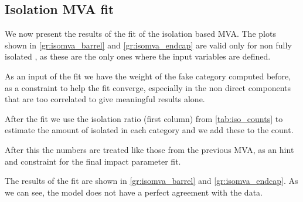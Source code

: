 \subsection{Isolation MVA fit}
\label{subsec:iso_mva_fit}

We now present the results of the fit of the isolation based MVA. 
The plots shown in \autoref{gr:isomva_barrel} and \autoref{gr:isomva_endcap} are valid only for non fully isolated \Pgm, as these are the only ones where the input variables are defined.

As an input of the fit we have the weight of the fake category computed before, as a constraint to help the fit converge, especially in the non direct components that are too correlated to give meaningful results alone.

After the fit we use the isolation ratio (first column) from \autoref{tab:iso_counts} to estimate the amount of isolated \Pgm in each category and we add these to the count.

After this the numbers are treated like those from the previous MVA, as an hint and constraint for the final impact parameter fit.

The results of the fit are shown in \autoref{gr:isomva_barrel} and \autoref{gr:isomva_endcap}.
As we can see, the model does not have a perfect agreement with the data.

